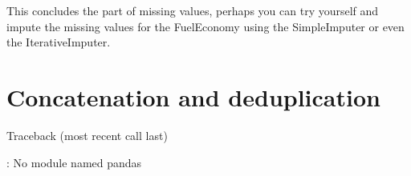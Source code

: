 \documentclass[letterpaper,10pt,english]{jupyterBook}
\begin{document}
\sphinxAtStartPar
This concludes the part of missing values, perhaps you can try yourself and impute the missing values for the FuelEconomy using the SimpleImputer or even the IterativeImputer.


\chapter{Concatenation and deduplication}
\label{\detokenize{c2_data_preparation/concatenation_deduplication:concatenation-and-deduplication}}\label{\detokenize{c2_data_preparation/concatenation_deduplication::doc}}
\sphinxAtStartPar
{}

\begin{sphinxVerbatim}[commandchars=\\\{\}]
   
\end{sphinxVerbatim}

\begin{sphinxVerbatim}[commandchars=\\\{\}]
Traceback (most recent call last)
  
    

: No module named \PYGZsq{}pandas\PYGZsq{}
\end{sphinxVerbatim}

\begin{sphinxVerbatim}[commandchars=\\\{\}]
  
\end{sphinxVerbatim}
\end{document}
